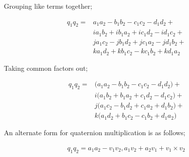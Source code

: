 \documentclass[12pt, a4paper]{article}
\begin{document}
Grouping like terms together;

\begin{align*}
q_{1}q_{2} = &a_{1}a_{2}  - b_{1}b_{2}  - c_{1}c_{2}  - d_{1}d_{2}  + \\
             &ia_{1}b_{2} + ib_{1}a_{2} + ic_{1}d_{2} - id_{1}c_{2} + \\
             &ja_{1}c_{2} - jb_{1}d_{2} + jc_{1}a_{2} - jd_{1}b_{2} + \\
             &ka_{1}d_{2} + kb_{1}c_{2} - kc_{1}b_{2} + kd_{1}a_{2}
\end{align*}

Taking common factors out;

\begin{align*}
q_{1}q_{2} = &\bigl(a_{1}a_{2}  - b_{1}b_{2} - c_{1}c_{2} - d_{1}d_{2}\bigr) + \\
             &i\bigl(a_{1}b_{2} + b_{1}a_{2} + c_{1}d_{2} - d_{1}c_{2}\bigr) + \\
             &j\bigl(a_{1}c_{2} - b_{1}d_{2} + c_{1}a_{2} + d_{1}b_{2}\bigr) + \\
             &k\bigl(a_{1}d_{2} + b_{1}c_{2} - c_{1}b_{2} + d_{1}a_{2}\bigr)
\end{align*}

An alternate form for quaternion multiplication is as follows;

\begin{align*}
q_{1}q_{2} = a_{1}a_{2} - v_{1}v_{2},a_{1}v_{2} + a_{2}v_{1} + v_{1}\times v_{2}
\end{align*}
\end{document}
